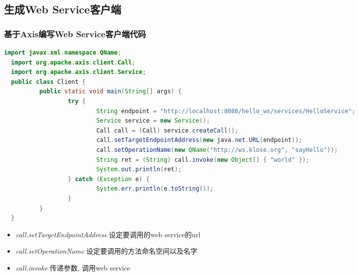 \documentclass[CJKutf8,compress,hyperref]{beamer}
\begin{document}
\begin{CJK}{UTF8}{song}
  \subsection{生成Web Service客户端}
  \begin{frame}[containsverbatim]
  \frametitle{基于Axis编写Web Service客户端代码} 
  \begin{lstlisting}[language=JAVA]
  import javax.xml.namespace.QName;
  import org.apache.axis.client.Call;
  import org.apache.axis.client.Service;
  public class Client {
          public static void main(String[] args) {
                  try {
                          String endpoint = "http://localhost:8080/hello_ws/services/HelloService";
                          Service service = new Service();
                          Call call = (Call) service.createCall();
                          call.setTargetEndpointAddress(new java.net.URL(endpoint));
                          call.setOperationName(new QName("http://ws.klose.org", "sayHello"));
                          String ret = (String) call.invoke(new Object[] { "world" });
                          System.out.println(ret);
                  } catch (Exception e) {
                          System.err.println(e.toString());
                  }
          }
  }
  \end{lstlisting}
  \begin{itemize}
          \item {\color{red}\emph{call.setTargetEndpointAddress}} \small{设定要调用的web service的url}
          \item {\color{red}\emph{call.setOperationName}} \small{设定要调用的方法命名空间以及名字}
          \item {\color{red}\emph{call.invoke}} \small{传递参数, 调用web service}
  \end{itemize}
  \end{frame}


\end{CJK}
\end{document}
